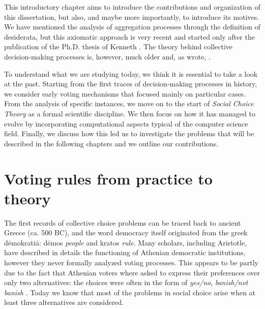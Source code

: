 This introductory chapter aims to introduce the contributions and organization of this dissertation, but also, and maybe more importantly, to introduce its motives.
We have mentioned the analysis of aggregation processes through the definition of desiderata, but this axiomatic approach is very recent and started only after the publication of the Ph.D. thesis of Kenneth \citet{Arrow1951}.
The theory behind collective decision-making processes is, however, much older and, as \citet{McLean1990} wrote, . 

To understand what we are studying today, we think it is essential to take a look at the past.
Starting from the first traces of decision-making processes in history, we consider early voting mechanisms that focused mainly on particular cases.
From the analysis of specific instances, we move on to the start of \textit{Social Choice Theory} as a formal scientific discipline.
We then focus on how it has managed to evolve by incorporating computational aspects typical of the computer science field.
Finally, we discuss how this led us to investigate the problems that will be described in the following chapters and we outline our contributions.

\section{Voting rules from practice to theory}
The first records of collective choice problems can be traced back to ancient Greece (ca. 500 BC), and the word democracy itself originated from the greek dēmokratiā: dēmos \textit{people} and kratos \textit{rule}.
Many scholars, including Aristotle, have described in details the functioning of Athenian democratic institutions, however they never formally analyzed voting processes. This appears to be partly due to the fact that Athenian voters where asked to express their preferences over only two alternatives: the choices were often in the form of \textit{yes/no}, \textit{banish/not banish} \citep{McLeanUrken1995}. Today we know that most of the problems in social choice arise when at least three alternatives are considered.

